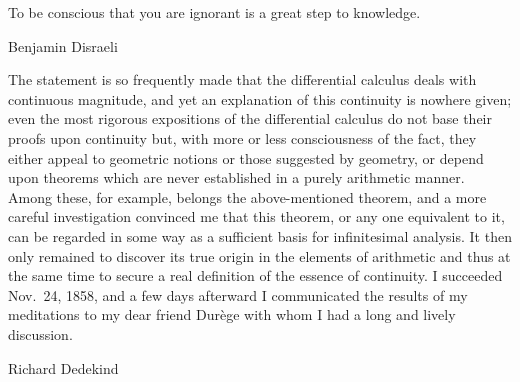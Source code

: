 \documentclass[11pt,oneside,openany]{book}
\begin{document}
\frontmatter





\mainmatter

\epigraph{%
  To be conscious that you are ignorant is a great step to knowledge.%
}{Benjamin Disraeli}



\epigraph{%
  The statement is so frequently made that the differential calculus deals
  with continuous magnitude, and yet an explanation of this continuity is
  nowhere given; even the most rigorous expositions of the differential
  calculus do not base their proofs upon continuity but, with more or less
  consciousness of the fact, they either appeal to geometric notions or those
  suggested by geometry, or depend upon theorems which are never established
  in a purely arithmetic manner. Among these, for example, belongs the
  above-mentioned theorem, and a more careful investigation convinced me that
  this theorem, or any one equivalent to it, can be regarded in some way as a
  sufficient basis for infinitesimal analysis. It then only remained to
  discover its true origin in the elements of arithmetic and thus at the same
  time to secure a real definition of the essence of continuity. I succeeded
  Nov.~24, 1858, and a few days afterward I communicated the results of my
  meditations to my dear friend Dur\`ege with whom I had a long and lively
  discussion.%
}{Richard Dedekind}
































\backmatter




\end{document}
